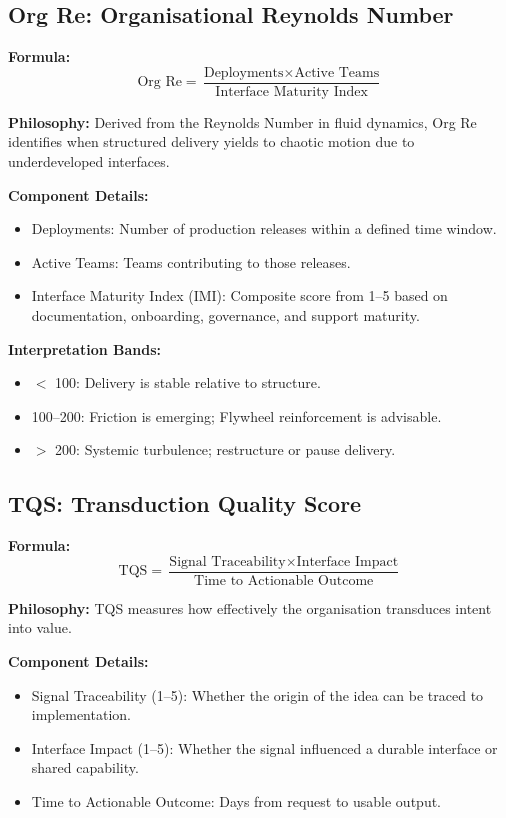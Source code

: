 \documentclass[12pt]{article}
\begin{document}
\subsection{Org Re: Organisational Reynolds Number}

\textbf{Formula:}
\[
\text{Org Re} = \frac{\text{Deployments} \times \text{Active Teams}}{\text{Interface Maturity Index}}
\]

\textbf{Philosophy:} Derived from the Reynolds Number in fluid dynamics, Org Re identifies when structured delivery yields to chaotic motion due to underdeveloped interfaces.

\textbf{Component Details:}
\begin{itemize}
    \item Deployments: Number of production releases within a defined time window.
    \item Active Teams: Teams contributing to those releases.
    \item Interface Maturity Index (IMI): Composite score from 1–5 based on documentation, onboarding, governance, and support maturity.
\end{itemize}

\textbf{Interpretation Bands:}
\begin{itemize}
    \item $<$ 100: Delivery is stable relative to structure.
    \item 100--200: Friction is emerging; Flywheel reinforcement is advisable.
    \item $>$ 200: Systemic turbulence; restructure or pause delivery.
\end{itemize}

\subsection{TQS: Transduction Quality Score}

\textbf{Formula:}
\[
\text{TQS} = \frac{\text{Signal Traceability} \times \text{Interface Impact}}{\text{Time to Actionable Outcome}}
\]

\textbf{Philosophy:} TQS measures how effectively the organisation transduces intent into value.

\textbf{Component Details:}
\begin{itemize}
    \item Signal Traceability (1–5): Whether the origin of the idea can be traced to implementation.
    \item Interface Impact (1–5): Whether the signal influenced a durable interface or shared capability.
    \item Time to Actionable Outcome: Days from request to usable output.
\end{itemize}
\end{document}
